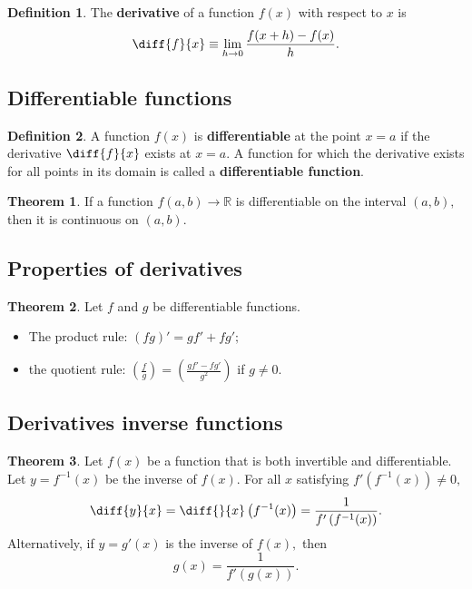 \documentclass[12pt, a4paper]{article}
\newcommand{\bb}[1]{\mathbb{#1}}
\newcommand{\f}[2]{\frac{#1}{#2}}
\theoremstyle{definition}
\newtheorem{definition}{Definition}[section]
\newtheorem{theorem}{Theorem}[section]
\theoremstyle{plain}
\begin{document}
\begin{definition}
The \textbf{derivative} of a function $f(x)$ with respect to $x$ is $$\diff{f}{x} \equiv \lim_{h\to0} \f{f(x+h)-f(x)}{h}.$$
\end{definition}

\subsection{Differentiable functions}

\begin{definition}
A function $f(x)$ is \textbf{differentiable} at the point $x = a$ if the derivative $\diff{f}{x}$ exists at $x = a.$ A function for which the derivative exists for all points in its domain is called a \textbf{differentiable function}.
\end{definition}

\begin{theorem}
If a function $f(a,b)\to \bb{R}$ is differentiable on the interval $(a,b),$ then it is continuous on $(a,b).$
\end{theorem}

\subsection{Properties of derivatives}

\begin{theorem}
Let $f$ and $g$ be differentiable functions. \begin{itemize}
	\item The product rule: $(fg)'=gf'+fg';$
	\item the quotient rule: $\left(\f{f}{g}\right)=\left(\f{gf'-fg'}{g^2}\right)$ if $g\neq 0.$
\end{itemize}
\end{theorem}

\subsection{Derivatives inverse functions}

\begin{theorem}
Let $f(x)$ be a function that is both invertible and differentiable. Let $y=f^{-1}(x)$ be the inverse of $f(x).$ For all $x$ satisfying $f'\left(f^{-1}(x)\right)\neq 0,$ $$\diff{y}{x}=\diff{}{x}\left(f^{-1}(x)\right)=\f{1}{f'\left(f^{-1}(x)\right)}.$$ Alternatively, if $y=g'(x)$ is the inverse of $f(x),$ then $$g(x)=\f{1}{f'(g(x))}.$$
\end{theorem}
\end{document}
